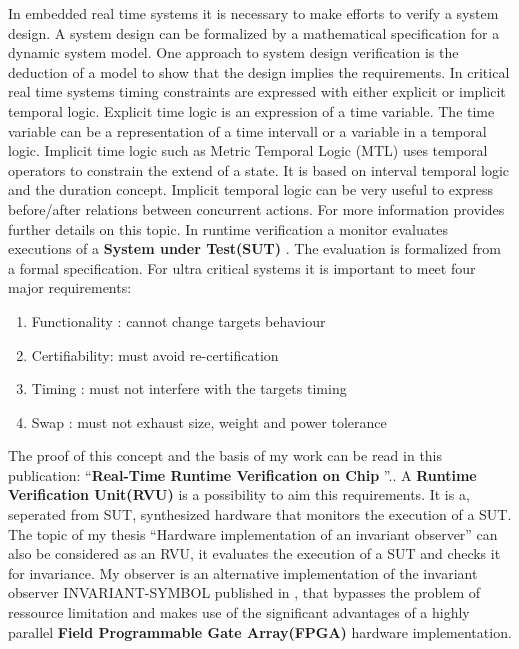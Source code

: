 In embedded real time systems it is necessary to make efforts to verify a system design.
A system design can be formalized by a mathematical specification for a dynamic system model.
One approach to system design verification is the deduction of a model to show that the design implies 
the requirements. 
In critical real time systems timing constraints are expressed with either explicit or implicit
temporal logic. 
Explicit time logic is an expression of a time variable. The time variable can be a representation of a time intervall or
a variable in a temporal logic. Implicit time logic such as Metric Temporal Logic (MTL) 
uses temporal operators to constrain the extend of a state.
It is based on interval temporal logic and the duration concept.
Implicit temporal logic can be very useful to express before/after relations
between concurrent actions.
For more information \cite{210306} provides further details on this topic.
In runtime verification a monitor evaluates executions of 
a \textbf{System under Test(SUT)} \cite{RTFMBJ13}. 
The evaluation is formalized from a formal specification.
For ultra critical systems it is important to meet four major requirements:
\begin{enumerate}
 \item Functionality : cannot change targets behaviour
 \item Certifiability: must avoid re-certification
 \item Timing :	  must not interfere with the targets timing
 \item Swap :     must not exhaust size, weight and power tolerance
\end{enumerate}
\newpage
The proof of this concept and the basis of my work can be read in this publication: 
``\textbf{Real-Time Runtime Verification on Chip} ''.\cite{RTFMBJ13}.\newline
A \textbf{Runtime Verification Unit(RVU)} is a possibility to aim this requirements.
It is a, seperated from SUT, synthesized hardware that monitors the execution of a SUT.\newline
The topic of my thesis ``Hardware implementation of an invariant observer'' can also be considered as an RVU, 
it evaluates the execution of a SUT and checks it for invariance.
My observer is an alternative  implementation of the invariant observer INVARIANT-SYMBOL published in \cite{RTFMBJ13},
that bypasses the problem of ressource limitation and makes use of the significant advantages of a highly parallel
\textbf{Field Programmable Gate Array(FPGA)} hardware implementation.





